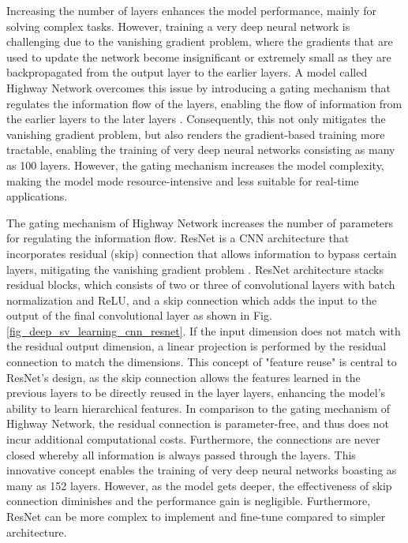 \documentclass[preprint,12pt]{elsarticle}
\begin{document}
Increasing the number of layers enhances the model performance, mainly for solving complex tasks. However, training a very deep neural network is challenging due to the vanishing gradient problem, where the gradients that are used to update the network become insignificant or extremely small as they are backpropagated from the output layer to the earlier layers. A model called Highway Network overcomes this issue by introducing a gating mechanism that regulates the information flow of the layers, enabling the flow of information from the earlier layers to the later layers \citep{srivastava_highway_2015}. Consequently, this not only mitigates the vanishing gradient problem, but also renders the gradient-based training more tractable, enabling the training of very deep neural networks consisting as many as 100 layers. However, the gating mechanism increases the model complexity, making the model mode resource-intensive and less suitable for real-time applications.

The gating mechanism of Highway Network increases the number of parameters for regulating the information flow. ResNet is a CNN architecture that incorporates residual (skip) connection that allows information to bypass certain layers, mitigating the vanishing gradient problem \citep{he_deep_2015}. ResNet architecture stacks residual blocks, which consists of two or three of convolutional layers with batch normalization and ReLU, and a skip connection which adds the input to the output of the final convolutional layer as shown in Fig. \ref{fig_deep_sv_learning_cnn_resnet}. If the input dimension does not match with the residual output dimension, a linear projection is performed by the residual connection to match the dimensions. This concept of "feature reuse" is central to ResNet's design, as the skip connection allows the features learned in the previous layers to be directly reused in the layer layers, enhancing the model's ability to learn hierarchical features. In comparison to the gating mechanism of Highway Network, the residual connection is parameter-free, and thus does not incur additional computational costs. Furthermore, the connections are never closed whereby all information is always passed through the layers. This innovative concept enables the training of very deep neural networks boasting as many as 152 layers. However, as the model gets deeper, the effectiveness of skip connection diminishes and the performance gain is negligible. Furthermore, ResNet can be more complex to implement and fine-tune compared to simpler architecture.
\end{document}
